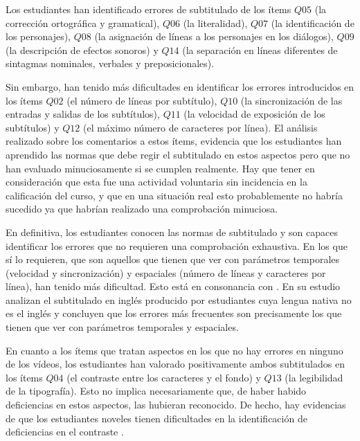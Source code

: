 \documentclass[
  12pt,
  a4paper,
  extrafontsizes,
  onecolumn,
  openright,
  table]{memoir}
\begin{document}
Los estudiantes han identificado errores de subtitulado de los ítems
\(Q05\) (la corrección ortográfica y gramatical), \(Q06\) (la
literalidad), \(Q07\) (la identificación de los personajes), \(Q08\) (la
asignación de líneas a los personajes en los diálogos), \(Q09\) (la
descripción de efectos sonoros) y \(Q14\) (la separación en líneas
diferentes de sintagmas nominales, verbales y preposicionales).

Sin embargo, han tenido más dificultades en identificar los errores
introducidos en los ítems \(Q02\) (el número de líneas por subtítulo),
\(Q10\) (la sincronización de las entradas y salidas de los subtítulos),
\(Q11\) (la velocidad de exposición de los subtítulos) y \(Q12\) (el
máximo número de caracteres por línea). El análisis realizado sobre los
comentarios a estos ítems, evidencia que los estudiantes han aprendido
las normas que debe regir el subtitulado en estos aspectos pero que no
han evaluado minuciosamente si se cumplen realmente. Hay que tener en
consideración que esta fue una actividad voluntaria sin incidencia en la
calificación del curso, y que en una situación real esto probablemente
no habría sucedido ya que habrían realizado una comprobación minuciosa.

En definitiva, los estudiantes conocen las normas de subtitulado y son
capaces identificar los errores que no requieren una comprobación
exhaustiva. En los que sí lo requieren, que son aquellos que tienen que
ver con parámetros temporales (velocidad y sincronización) y espaciales
(número de líneas y caracteres por línea), han tenido más dificultad.
Esto está en consonancia con \textcite{khafik2022}. En su estudio
analizan el subtitulado en inglés producido por estudiantes cuya lengua
nativa no es el inglés y concluyen que los errores más frecuentes son
precisamente los que tienen que ver con parámetros temporales y
espaciales.

En cuanto a los ítems que tratan aspectos en los que no hay errores en
ninguno de los vídeos, los estudiantes han valorado positivamente ambos
subtitulados en los ítems \(Q04\) (el contraste entre los caracteres y
el fondo) y \(Q13\) (la legibilidad de la tipografía). Esto no implica
necesariamente que, de haber habido deficiencias en estos aspectos, las
hubieran reconocido. De hecho, hay evidencias de que los estudiantes
noveles tienen dificultades en la identificación de deficiencias en el
contraste \autocite[ver][]{jperez2}.
\end{document}
